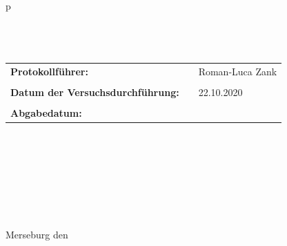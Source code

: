 \begin{center}
\begin{tabular}{p{\textwidth}}
\\ \\ \\ \\

\begin{center}
\begin{tabular}{lll}
\large{\textbf{Protokollführer:}} & & \large{Roman-Luca Zank}\\
&&\\
\large{\textbf{Datum der Versuchsdurchführung:}}&& \large{22.10.2020}\\
&&\\
\large{\textbf{Abgabedatum:}}&& \large{\todayDE}
\end{tabular}
\end{center}

\\ \\ \\ \\ \\ \\ \\
\large{Merseburg den \todayDE}

\end{tabular}
\end{center}
